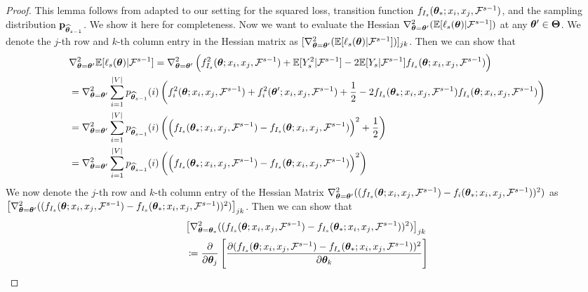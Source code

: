 \begin{proof}
This lemma follows from \citet{ frostig2015competing, mukherjee2020generalized} adapted to our setting for the squared loss,  transition function $f_{I_s}(\bm{\theta}_*; x_i, x_j, \mathcal{F}^{s-1})$, and the sampling distribution $\mathbf{p}_{{\widehat{\bm{\theta}}}_{s-1}}$. We show it here for completeness. Now we want to evaluate the Hessian $\nabla^2_{\bm{\theta} = \bm{\theta}^{\prime}}(\mathbb{E}[\ell_{s}(\bm{\theta})|\mathcal{F}^{s-1}])$ at any $\bm{\theta}^{\prime}\in\bm{\Theta}$. We denote the $j$-th row and $k$-th column entry in the Hessian matrix as $[\nabla^2_{\bm{\theta} = \bm{\theta}^{\prime}}(\mathbb{E}[\ell_{s}(\bm{\theta})|\mathcal{F}^{s-1}])]_{jk}$. Then we can show that
\begin{align}
     &\nabla^2_{\bm{\theta} = \bm{\theta}^{\prime}}  \mathbb{E}[\ell_{s}(\bm{\theta})|\mathcal{F}^{s-1}]
    = \nabla^2_{\bm{\theta} = \bm{\theta}^{\prime}} \left(f^2_{I_s}(\bm{\theta}; x_i, x_j, \mathcal{F}^{s-1}) + \mathbb{E}[Y^2_s|\mathcal{F}^{s-1}] - 2\mathbb{E}[Y_s|\mathcal{F}^{s-1}]f_{I_s}(\bm{\theta}; x_i, x_j, \mathcal{F}^{s-1})\right)\nonumber\\
    &= \nabla^2_{\bm{\theta} = \bm{\theta}^{\prime}} \sum_{i=1}^{|V|} p_{{\widehat{\bm{\theta}}}_{s-1}}(i)\left(f^2_{i}(\bm{\theta} ; x_i, x_j, \mathcal{F}^{s-1}) + f^2_{i}(\bm{\theta}^{\prime} ; x_i, x_j, \mathcal{F}^{s-1}) + \frac{1}{2} - 2f_{I_s}(\bm{\theta}_*; x_i, x_j, \mathcal{F}^{s-1})f_{I_s}(\bm{\theta} ; x_i, x_j, \mathcal{F}^{s-1})\right)\nonumber\\
    &=  \nabla^2_{\bm{\theta} = \bm{\theta}^{\prime}} \sum_{i=1}^{|V|} p_{{\widehat{\bm{\theta}}}_{s-1}}(i)\left(\left(f_{I_s}(\bm{\theta}_*; x_i, x_j, \mathcal{F}^{s-1}) - f_{I_s}(\bm{\theta} ; x_i, x_j, \mathcal{F}^{s-1})\right)^2 + \frac{1}{2} \right)\nonumber\\
    &=  \nabla^2_{\bm{\theta} = \bm{\theta}^{\prime}}\sum_{i=1}^{|V|} p_{{\widehat{\bm{\theta}}}_{s-1}}(i)\left(\left(f_{I_s}(\bm{\theta}_*; x_i, x_j, \mathcal{F}^{s-1}) - f_{I_s}(\bm{\theta} ; x_i, x_j, \mathcal{F}^{s-1})\right)^2  \right)\label{eq:Hessian-expectation}
\end{align}
We now denote the $j$-th row and $k$-th column entry of the Hessian Matrix $\nabla^2_{\bm{\theta} = \bm{\theta}^{\prime}}((f_{I_s}(\bm{\theta} ; x_i, x_j, \mathcal{F}^{s-1}) - f_i(\bm{\theta}_* ; x_i, x_j, \mathcal{F}^{s-1}))^2)$ as $\big[\nabla^2_{\bm{\theta} = \bm{\theta}^{\prime}}((f_{I_s}(\bm{\theta} ; x_i, x_j, \mathcal{F}^{s-1}) - f_{I_s}(\bm{\theta}_*; x_i, x_j, \mathcal{F}^{s-1}))^2)\big]_{jk}$. Then we can show that
\begin{align*}
    &\big[\nabla^2_{\btheta = \btheta_*}((f_{I_s}(\btheta ; x_i, x_j, \F^{s-1}) - f_{I_s}(\btheta_*; x_i, x_j, \F^{s-1}))^2)\big]_{jk} \\
    &\coloneqq \frac{\partial }{\partial \btheta_j} \left[\frac{\partial (f_{I_s}(\btheta ; x_i, x_j, \F^{s-1}) - f_{I_s}(\btheta_*; x_i, x_j, \F^{s-1}))^2}{\partial \btheta_k}\right] \\

\end{align*}
\end{proof}
